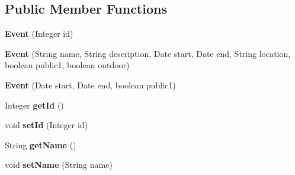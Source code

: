 \subsection*{Public Member Functions}
\begin{DoxyCompactItemize}
\item 
\hypertarget{classit_1_1polimi_1_1se_1_1calcare_1_1entities_1_1Event_aa9dbce8fcd05bcea3761e66dc7db5170}{}{\bfseries Event} (Integer id)\label{classit_1_1polimi_1_1se_1_1calcare_1_1entities_1_1Event_aa9dbce8fcd05bcea3761e66dc7db5170}

\item 
\hypertarget{classit_1_1polimi_1_1se_1_1calcare_1_1entities_1_1Event_a952ea31c07198381750f4af6d1f78477}{}{\bfseries Event} (String name, String description, Date start, Date end, String location, boolean public1, boolean outdoor)\label{classit_1_1polimi_1_1se_1_1calcare_1_1entities_1_1Event_a952ea31c07198381750f4af6d1f78477}

\item 
\hypertarget{classit_1_1polimi_1_1se_1_1calcare_1_1entities_1_1Event_a8f9b6d4b4de5754c983f54b7769e640e}{}{\bfseries Event} (Date start, Date end, boolean public1)\label{classit_1_1polimi_1_1se_1_1calcare_1_1entities_1_1Event_a8f9b6d4b4de5754c983f54b7769e640e}

\item 
\hypertarget{classit_1_1polimi_1_1se_1_1calcare_1_1entities_1_1Event_a395d0695be24d71fa15af0e071443fbe}{}Integer {\bfseries get\+Id} ()\label{classit_1_1polimi_1_1se_1_1calcare_1_1entities_1_1Event_a395d0695be24d71fa15af0e071443fbe}

\item 
\hypertarget{classit_1_1polimi_1_1se_1_1calcare_1_1entities_1_1Event_a027d540dbb700956502abf436486950a}{}void {\bfseries set\+Id} (Integer id)\label{classit_1_1polimi_1_1se_1_1calcare_1_1entities_1_1Event_a027d540dbb700956502abf436486950a}

\item 
\hypertarget{classit_1_1polimi_1_1se_1_1calcare_1_1entities_1_1Event_a4392f7dbc87e48e97a2dcdeb6f3b911d}{}String {\bfseries get\+Name} ()\label{classit_1_1polimi_1_1se_1_1calcare_1_1entities_1_1Event_a4392f7dbc87e48e97a2dcdeb6f3b911d}

\item 
\hypertarget{classit_1_1polimi_1_1se_1_1calcare_1_1entities_1_1Event_a26d02455538160aca57a9399db6b7f11}{}void {\bfseries set\+Name} (String name)\label{classit_1_1polimi_1_1se_1_1calcare_1_1entities_1_1Event_a26d02455538160aca57a9399db6b7f11}


\end{DoxyCompactItemize}
